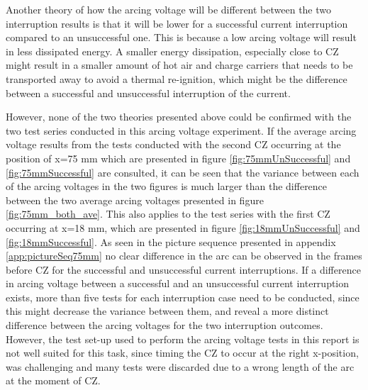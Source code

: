 \documentclass[10pt,b5paper,twoside]{article}
\begin{document}
Another theory of how the arcing voltage will be different between the two interruption results is that it will be lower for a successful current interruption compared to an unsuccessful one. This is because a low arcing voltage will result in less dissipated energy. A smaller energy dissipation, especially close to CZ might result in a smaller amount of hot air and charge carriers that needs to be transported away to avoid a thermal re-ignition, which might be the difference between a successful and unsuccessful interruption of the current.

However, none of the two theories presented above could be confirmed with the two test series conducted in this arcing voltage experiment. If the average arcing voltage results from the tests conducted with the second CZ occurring at the position of x=75 mm which are presented in figure \ref{fig:75mmUnSuccessful} and \ref{fig:75mmSuccessful} are consulted, it can be seen that the variance between each of the arcing voltages in the two figures is much larger than the difference between the two average arcing voltages presented in figure \ref{fig:75mm_both_ave}. This also applies to the test series with the first CZ occurring at x=18 mm, which are presented in figure \ref{fig:18mmUnSuccessful} and \ref{fig:18mmSuccessful}. As seen in the picture sequence presented in appendix \ref{app:pictureSeq75mm} no clear difference in the arc can be observed in the frames before CZ for the successful and unsuccessful current interruptions. If a difference in arcing voltage between a successful and an unsuccessful current interruption exists, more than five tests for each interruption case need to be conducted, since this might decrease the variance between them, and reveal a more distinct difference between the arcing voltages for the two interruption outcomes. However, the test set-up used to perform the arcing voltage tests in this report is not well suited for this task, since timing the CZ to occur at the right x-position, was challenging and many tests were discarded due to a wrong length of the arc at the moment of CZ.
\end{document}
